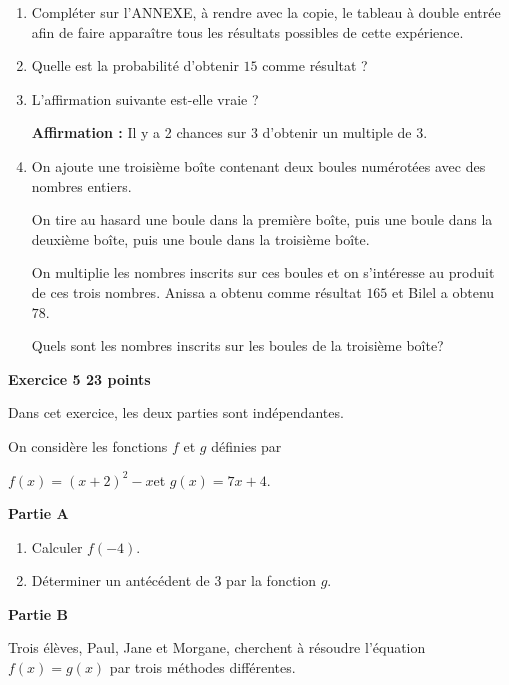 \documentclass[11pt]{article}
\begin{document}
\begin{enumerate}
\item Compléter sur l'ANNEXE, à rendre avec la copie, le tableau à double entrée afin de faire apparaître tous les résultats possibles de cette expérience.
\item Quelle est la probabilité d'obtenir $15$ comme résultat ?
\item L'affirmation suivante est-elle vraie ?

\textbf{Affirmation :} Il y a 2 chances sur 3 d'obtenir un multiple de 3.
\item On ajoute une troisième boîte contenant deux boules numérotées avec des nombres entiers.

On tire au hasard une boule dans la première boîte, puis une boule dans la deuxième boîte, puis une boule dans la troisième boîte.

On multiplie les nombres inscrits sur ces boules et on s'intéresse au produit de ces trois nombres. Anissa a obtenu comme résultat $165$ et Bilel a obtenu $78$.

Quels sont les nombres inscrits sur les boules de la troisième boîte?
\end{enumerate}

\bigskip

\textbf{\large{}Exercice 5 \hfill 23 points}

\medskip

Dans cet exercice, les deux parties sont indépendantes.

On considère les fonctions $f$ et $g$ définies par 

\begin{center} $f(x) = (x + 2)^2 - x$\quad et \quad  $g(x) = 7x + 4$.\end{center}

\smallskip

\textbf{Partie A}

\medskip

\begin{enumerate}
\item Calculer $f(- 4)$.
\item Déterminer un antécédent de $3$ par la fonction $g$.
\end{enumerate}

\medskip

\textbf{Partie B}

\medskip

Trois élèves, Paul, Jane et Morgane, cherchent à résoudre l'équation $f(x) = g(x)$ par trois méthodes différentes.
\end{document}
